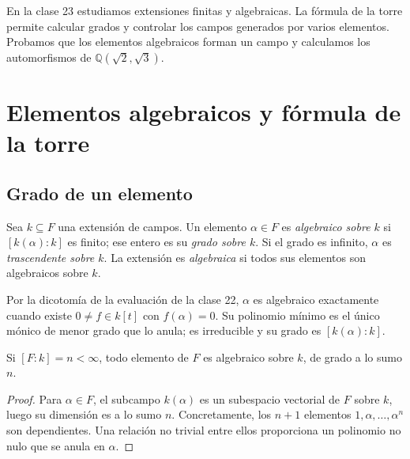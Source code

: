 En la clase 23 estudiamos extensiones finitas y algebraicas. La fórmula de la torre permite calcular grados y controlar los campos generados por varios elementos. Probamos que los elementos algebraicos forman un campo y calculamos los automorfismos de $\mathbb Q(\sqrt2,\sqrt3)$.

\section{Elementos algebraicos y fórmula de la torre}
\subsection{Grado de un elemento}
\begin{defi}
Sea $k\subseteq F$ una extensión de campos. Un elemento $\alpha\in F$ es \emph{algebraico sobre $k$} si $[k(\alpha):k]$ es finito; ese entero es su \emph{grado sobre $k$}. Si el grado es infinito, $\alpha$ es \emph{trascendente sobre $k$}. La extensión es \emph{algebraica} si todos sus elementos son algebraicos sobre $k$.
\end{defi}
Por la dicotomía de la evaluación de la clase 22, $\alpha$ es algebraico exactamente cuando existe $0\ne f\in k[t]$ con $f(\alpha)=0$. Su polinomio mínimo es el único mónico de menor grado que lo anula; es irreducible y su grado es $[k(\alpha):k]$.

\begin{lema}\label{lema:C23-finita-algebraica}
Si $[F:k]=n<\infty$, todo elemento de $F$ es algebraico sobre $k$, de grado a lo sumo $n$.
\end{lema}
\begin{proof}
Para $\alpha\in F$, el subcampo $k(\alpha)$ es un subespacio vectorial de $F$ sobre $k$, luego su dimensión es a lo sumo $n$. Concretamente, los $n+1$ elementos $1,\alpha,\ldots,\alpha^n$ son dependientes. Una relación no trivial entre ellos proporciona un polinomio no nulo que se anula en $\alpha$.
\end{proof}

